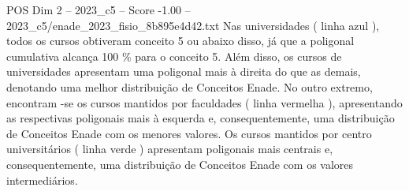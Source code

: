 \begin{textsample}{POS Dim 2 – 2023\_c5 – Score -1.00 – 2023\_c5/enade\_2023\_fisio\_8b895e4d42.txt}
Nas universidades ( linha azul ), todos os cursos obtiveram conceito 5 ou abaixo disso, já que a poligonal cumulativa alcança 100 \% para o conceito 5.
Além disso, os cursos de universidades apresentam uma poligonal mais à direita do que as demais, denotando uma melhor distribuição de Conceitos Enade.
No outro extremo, encontram -se os cursos mantidos por faculdades ( linha vermelha ), apresentando as respectivas poligonais mais à esquerda e, consequentemente, uma distribuição de Conceitos Enade com os menores valores.
Os cursos mantidos por centro universitários ( linha verde ) apresentam poligonais mais centrais e, consequentemente, uma distribuição de Conceitos Enade com os valores intermediários.

\end{textsample}
